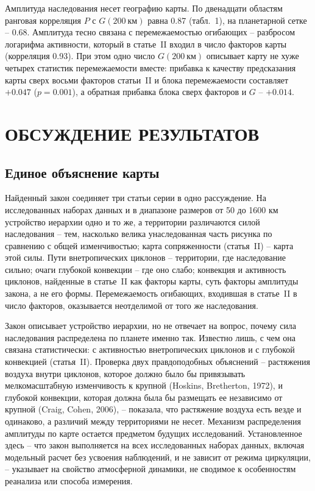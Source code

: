 \documentclass[12pt,a4paper]{article}
\begin{document}
Амплитуда наследования несет географию карты. По двенадцати областям ранговая корреляция $P$ с $G(200~\text{км})$ равна 0.87 (табл.~1), на планетарной сетке -- 0.68. Амплитуда тесно связана с перемежаемостью огибающих -- разбросом логарифма активности, который в статье~II входил в число факторов карты (корреляция 0.93). При этом одно число $G(200~\text{км})$ описывает карту не хуже четырех статистик перемежаемости вместе: прибавка к качеству предсказания карты сверх восьми факторов статьи~II и блока перемежаемости составляет $+0.047$ ($p = 0.001$), а обратная прибавка блока сверх факторов и $G$ -- $+0.014$.

\section{ОБСУЖДЕНИЕ РЕЗУЛЬТАТОВ}

\subsection{Единое объяснение карты}

Найденный закон соединяет три статьи серии в одно рассуждение. На исследованных наборах данных и в диапазоне размеров от 50 до 1600 км устройство иерархии одно и то же, а территории различаются силой наследования -- тем, насколько велика унаследованная часть рисунка по сравнению с общей изменчивостью; карта сопряженности (статья~II) -- карта этой силы. Пути внетропических циклонов -- территории, где наследование сильно; очаги глубокой конвекции -- где оно слабо; конвекция и активность циклонов, найденные в статье~II как факторы карты, суть факторы амплитуды закона, а не его формы. Перемежаемость огибающих, входившая в статье~II в число факторов, оказывается неотделимой от того же наследования.

Закон описывает устройство иерархии, но не отвечает на вопрос, почему сила наследования распределена по планете именно так. Известно лишь, с чем она связана статистически: с активностью внетропических циклонов и с глубокой конвекцией (статья~II). Проверка двух правдоподобных объяснений -- растяжения воздуха внутри циклонов, которое должно было бы привязывать мелкомасштабную изменчивость к крупной (Hoskins, Bretherton, 1972), и глубокой конвекции, которая должна была бы размещать ее независимо от крупной (Craig, Cohen, 2006), -- показала, что растяжение воздуха есть везде и одинаково, а различий между территориями не несет. Механизм распределения амплитуды по карте остается предметом будущих исследований. Установленное здесь -- что закон выполняется на всех исследованных наборах данных, включая модельный расчет без усвоения наблюдений, и не зависит от режима циркуляции, -- указывает на свойство атмосферной динамики, не сводимое к особенностям реанализа или способа измерения.
\end{document}
